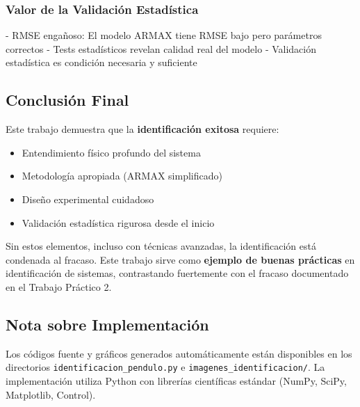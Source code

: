 \documentclass[a4paper,openright,9pt]{report}
\newcommand{\code}[1]{\texttt{#1}} %
\begin{document}
\subsubsection{Valor de la Validación Estadística}
- RMSE engañoso: El modelo ARMAX tiene RMSE bajo pero parámetros correctos
- Tests estadísticos revelan calidad real del modelo
- Validación estadística es condición necesaria y suficiente

\subsection{Conclusión Final}

Este trabajo demuestra que la \textbf{identificación exitosa} requiere:
\begin{itemize}
\item Entendimiento físico profundo del sistema
\item Metodología apropiada (ARMAX simplificado)
\item Diseño experimental cuidadoso
\item Validación estadística rigurosa desde el inicio
\end{itemize}

Sin estos elementos, incluso con técnicas avanzadas, la identificación está condenada al fracaso. Este trabajo sirve como \textbf{ejemplo de buenas prácticas} en identificación de sistemas, contrastando fuertemente con el fracaso documentado en el Trabajo Práctico 2.

\subsection{Nota sobre Implementación}

Los códigos fuente y gráficos generados automáticamente están disponibles en los directorios \code{identificacion\_pendulo.py} e \code{imagenes\_identificacion/}. La implementación utiliza Python con librerías científicas estándar (NumPy, SciPy, Matplotlib, Control).
\end{document}
